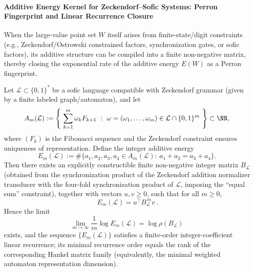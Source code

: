 \paragraph{Additive Energy Kernel for Zeckendorf--Sofic Systems: Perron Fingerprint and Linear Recurrence Closure}
When the large-value point set \(W\) itself arises from finite-state/digit constraints (e.g., Zeckendorf/Ostrowski constrained factors, synchronization gates, or sofic factors), its additive structure can be compiled into a finite non-negative matrix, thereby closing the exponential rate of the additive energy \(E(W)\) as a Perron fingerprint.

\begin{theorem}\label{thm:gm-zeck-sofic-additive-energy}
Let \(\mathcal{L}\subset\{0,1\}^\ast\) be a sofic language compatible with Zeckendorf grammar (given by a finite labeled graph/automaton), and let
\[
A_m(\mathcal{L})
:=\left\{\ \sum_{k=1}^{m}\omega_kF_{k+1}\ :\ \omega=(\omega_1,\dots,\omega_m)\in \mathcal{L}\cap\{0,1\}^m\ \right\}\subset\NN,
\]
where \((F_k)\) is the Fibonacci sequence and the Zeckendorf constraint ensures uniqueness of representation.
Define the integer additive energy
\[
E_m(\mathcal{L})
:=\#\{a_1,a_2,a_3,a_4\in A_m(\mathcal{L}):\ a_1+a_2=a_3+a_4\}.
\]
Then there exists an explicitly constructible finite non-negative integer matrix \(B_{\mathcal{L}}\) (obtained from the synchronization product of the Zeckendorf addition normalizer transducer with the four-fold synchronization product of \(\mathcal{L}\), imposing the ``equal sum'' constraint), together with vectors \(u,v\ge 0\), such that for all \(m\ge 0\),
\[
\boxed{\ E_m(\mathcal{L})=u^\top B_{\mathcal{L}}^{\,m}v\ }.
\]
Hence the limit
\[
\lim_{m\to\infty}\frac1m\log E_m(\mathcal{L})=\log\rho(B_{\mathcal{L}})
\]
exists, and the sequence \(\{E_m(\mathcal{L})\}\) satisfies a finite-order integer-coefficient linear recurrence; its minimal recurrence order equals the rank of the corresponding Hankel matrix family (equivalently, the minimal weighted automaton representation dimension).
\end{theorem}

